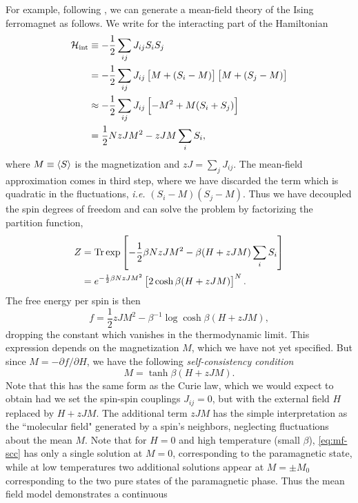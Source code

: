 For example, following \textcite{cardy1996scaling}, we can generate a mean-field
theory of the Ising ferromagnet as follows. We write for the interacting part
of the Hamiltonian
\begin{align*}
  \mathcal{H}_{\mathrm{int}}
  &\equiv -\frac{1}{2} \sum_{ij} J_{ij} S_i S_j \\
  &= -\frac{1}{2} \sum_{ij} J_{ij} \left[M + (S_i - M)\right]\left[M + (S_j - M)\right] \\
  &\approx -\frac{1}{2} \sum_{ij} J_{ij} \left[-M^2 + M(S_i + S_j)\right] \\
  &= \frac{1}{2} N z J M^2 - z J M \sum_i S_i,
\end{align*}
where $M \equiv \left< S \right>$ is the magnetization and $z J=\sum_j J_{ij}$. The
mean-field approximation comes in third step, where we have discarded the term
which is quadratic in the fluctuations, \textit{i.e.} $(S_i - M)(S_j - M)$.
Thus we have decoupled the spin degrees of freedom and can solve the problem by
factorizing the partition function,
\begin{align*}
  Z
  &= \operatorname{Tr}\exp\left[-\frac{1}{2} \beta N z J M^2 - \beta(H + z J M) \sum_i S_i\right] \\
  &= e^{-\frac{1}{2} \beta N z J M^2} \left[2 \cosh \beta(H + z J M)\right]^N.
\end{align*}
The free energy per spin is then
\begin{equation}
  f = \frac{1}{2} z J M^2 - \beta^{-1}\log\cosh\beta(H + z J M),
  \label{eq:mf-fe}
\end{equation}
dropping the constant which vanishes in the thermodynamic limit. This
expression depends on the magnetization $M$, which we have not yet specified.
But since $M = -\partial f / \partial H$, we have the following
\emph{self-consistency condition}
\begin{equation}
  M = \tanh\beta(H + z J M).
  \label{eq:mf-scc}
\end{equation}
Note that this has the same form as the Curie law, which we would expect to
obtain had we set the spin-spin couplings $J_{ij}=0$, but with the external
field $H$ replaced by $H + z J M$. The additional term $z J M$ has the simple
interpretation as the ``molecular field" generated by a spin's neighbors,
neglecting fluctuations about the mean $M$. Note that for $H=0$ and high
temperature (small $\beta$), \cref{eq:mf-scc} has only a single solution at
$M=0$, corresponding to the paramagnetic state, while at low temperatures two
additional solutions appear at $M=\pm M_0$ corresponding to the two pure states
of the paramagnetic phase. Thus the mean field model demonstrates a continuous
